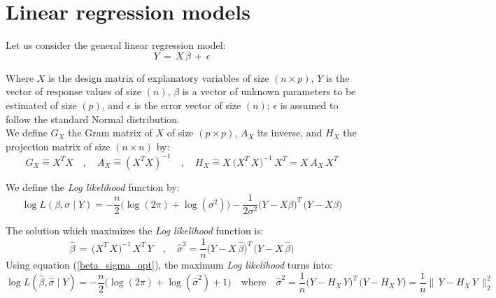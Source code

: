 %

\section{Linear regression models}

Let us consider the general linear regression model:
\begin{equation}
\boxed{
Y \,=\, X \,\beta\, +\, \epsilon }
\end{equation}

Where $X$ is the design matrix of explanatory variables of size $(n \times p)$,
$Y$ is the vector of response values of size $(n)$,
$\beta$ is a vector of unknown parameters to be estimated of size $(p)$,
and $\epsilon $ is the error vector of size $(n)$; $\epsilon$ is assumed to follow the standard Normal distribution.\\


We define $G_X$ the Gram matrix of $X$ of size $(p\times p)$, $A_X$ its inverse,
and $H_X$ the projection matrix of size $(n\times n)$ by:
\begin{equation}
G_X \hat{=}X^T X  \quad,\quad  A_X \hat{=}(X^T X)^{-1}  \quad,\quad
H_X \hat{=} X_{}\,\big(X^T_{} \,X_{}\big)^{-1} \,X^T_{}  =  X_{}\,A_X \,X^T_{}
 \end{equation}

We define the \emph{Log likelihood} function by:
\begin{equation}
\log L(\beta,\sigma\mid Y)= -\frac{n}{2}\big(\log(2\pi)+ \log(\sigma^2)\big)- \frac{1}{2\sigma^2}\big(Y-X\beta\big)^T\,\big(Y-X\beta\big)
\end{equation}

The solution which maximizes the \emph{Log likelihood} function is:
\begin{equation}
\label{beta_sigma_opt}
  \hat{\beta} \,=\, \big(X^T_{} \,X_{}\big)^{-1} \,X^T \, Y
\quad,\quad
\hat{\sigma}^2 = \frac{1}{n}\big(Y-X \,\hat{\beta}\big)^T\,\big(Y-X \,\hat{\beta}\big)
\end{equation}
Using equation (\ref{beta_sigma_opt}), the maximum \emph{Log likelihood} turns into:
\begin{equation}
\label{maxLogLikelihood}
\log L(\hat{\beta},\hat{\sigma}\mid Y)=-\frac{n}{2}\big(\log(2\pi)+ \log(\hat{\sigma}^2)+1\big)
\quad \text{where} \quad
\hat{\sigma}^2 = \frac{1}{n}\big(Y-H_X\,Y\big)^T\,\big(Y-H_X\,Y \big)=\frac{1}{n}\|\,Y-H_X\,Y\,\|^2_2
\end{equation}

